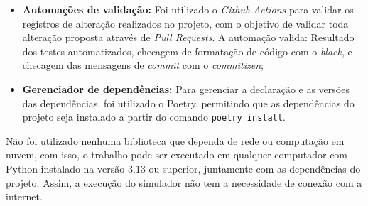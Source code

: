 \documentclass[
    12pt,
    openright,
    oneside,
    a4paper,
    english,
    brazil
]{abntex2}
\begin{document}
\begin{itemize}
		\item \textbf{Automações de validação:} Foi utilizado o \textit{Github Actions} para validar os registros de alteração realizados no projeto, com o objetivo de validar toda alteração proposta através de \textit{Pull Requests}. A automação valida: Resultado dos testes automatizados, checagem de formatação de código com o \textit{black}, e checagem das mensagens de \textit{commit} com o \textit{commitizen};
		\item \textbf{Gerenciador de dependências:} Para gerenciar a declaração e as versões das dependências, foi utilizado o Poetry, permitindo que as dependências do projeto seja instalado a partir do comando \texttt{poetry install}.
\end{itemize}

Não foi utilizado nenhuma biblioteca que dependa de rede ou computação em nuvem, com isso, o trabalho pode ser executado em qualquer computador com Python instalado na versão 3.13 ou superior, juntamente com as dependências do projeto. Assim, a execução do simulador não tem a necessidade de conexão com a internet.
\end{document}
